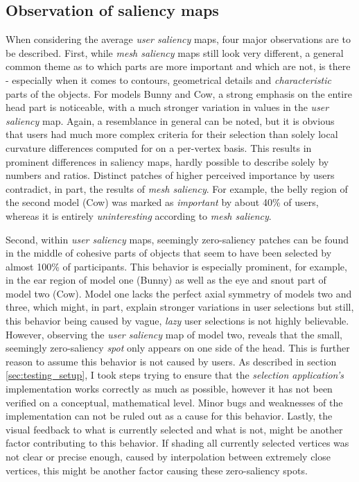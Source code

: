 		\subsection{Observation of saliency maps}
		\label{sec:mesh_saliency_with_mechanical_objects}
When considering the average \textit{user saliency} maps, four major observations are to be described. First, while \textit{mesh saliency} maps still look very different, a general common theme as to which parts are more important and which are not, is there - especially when it comes to contours, geometrical details and \textit{characteristic} parts of the objects. For models Bunny and Cow, a strong emphasis on the entire head part is noticeable, with a much stronger variation in values in the \textit{user saliency} map. Again, a resemblance in general can be noted, but it is obvious that users had much more complex criteria for their selection than solely local curvature differences computed for on a per-vertex basis. This results in prominent differences in saliency maps, hardly possible to describe solely by numbers and ratios. Distinct patches of higher perceived importance by users contradict, in part, the results of \textit{mesh saliency}. For example, the belly region of the second model (Cow) was marked as \textit{important} by about 40\% of users, whereas it is entirely \textit{uninteresting} according to \textit{mesh saliency}.

Second, within \textit{user saliency} maps, seemingly zero-saliency patches can be found in the middle of cohesive parts of objects that seem to have been selected by almost 100\% of participants. This behavior is especially prominent, for example, in the ear region of model one (Bunny) as well as the eye and snout part of model two (Cow). Model one lacks the perfect axial symmetry of models two and three, which might, in part, explain stronger variations in user selections but still, this behavior being caused by vague, \textit{lazy} user selections is not highly believable. However, observing the \textit{user saliency} map of model two, reveals that the small, seemingly zero-saliency \textit{spot} only appears on one side of the head. This is further reason to assume this behavior is not caused by users. As described in section \ref{sec:testing_setup}, I took steps trying to ensure that the \textit{selection application's} implementation works correctly as much as possible, however it has not been verified on a conceptual, mathematical level. Minor bugs and weaknesses of the implementation can not be ruled out as a cause for this behavior. Lastly, the visual feedback to what is currently selected and what is not, might be another factor contributing to this behavior. If shading all currently selected vertices was not clear or precise enough, caused by interpolation between extremely close vertices, this might be another factor causing these zero-saliency spots.

